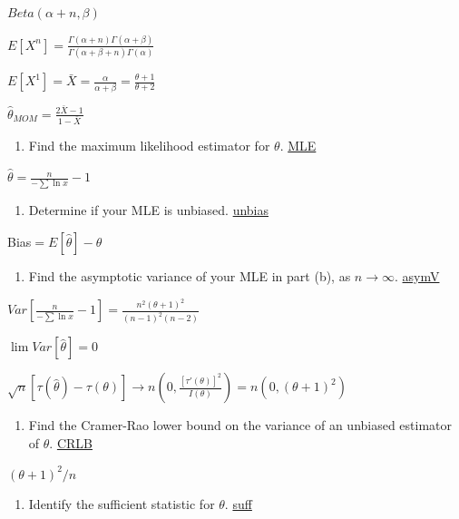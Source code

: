 \documentclass[10pt,twocolumn,portrait]{article}
\providecommand{\tightlist}{%
  \setlength{\itemsep}{0pt}\setlength{\parskip}{0pt}}
\begin{document}
\(Beta(\alpha+n,\beta)\)

\(E[X^n]=\frac{\Gamma(\alpha+n)\Gamma(\alpha+\beta)}{\Gamma(\alpha+\beta+n)\Gamma(\alpha)}\)

\(E[X^1]=\bar X=\frac{\alpha}{\alpha+\beta}=\frac{\theta+1}{\theta+2}\)

\(\hat\theta_{MOM}=\frac{2\bar X-1}{1-\bar X}\)

\begin{enumerate}
\def\labelenumi{(\alph{enumi})}
\setcounter{enumi}{1}
\tightlist
\item
  Find the maximum likelihood estimator for \(\theta\).
  \protect\hyperlink{MLE}{MLE}
\end{enumerate}

\(\hat\theta=\frac{n}{-\sum\ln x}-1\)

\begin{enumerate}
\def\labelenumi{(\alph{enumi})}
\setcounter{enumi}{2}
\tightlist
\item
  Determine if your MLE is unbiased.
  \protect\hyperlink{section-4}{unbias}
\end{enumerate}

Bias\(=E[\hat\theta]-\theta\)

\begin{enumerate}
\def\labelenumi{(\alph{enumi})}
\setcounter{enumi}{3}
\tightlist
\item
  Find the asymptotic variance of your MLE in part (b), as
  \(n\to\infty\). \protect\hyperlink{asymV}{asymV}
\end{enumerate}

\(Var[\frac{n}{-\sum\ln x}-1]=\frac{n^2(\theta+1)^2}{(n-1)^2(n-2)}\)

\(\lim Var[\hat\theta]=0\)

\(\sqrt{n}[\tau(\hat\theta)-\tau(\theta)]\to n(0,\frac{[\tau'(\theta)]^2}{I(\theta)})=n(0,(\theta+1)^2)\)

\begin{enumerate}
\def\labelenumi{(\alph{enumi})}
\setcounter{enumi}{4}
\tightlist
\item
  Find the Cramer-Rao lower bound on the variance of an unbiased
  estimator of \(\theta\). \protect\hyperlink{section-5}{CRLB}
\end{enumerate}

\((\theta+1)^2/n\)

\begin{enumerate}
\def\labelenumi{(\alph{enumi})}
\setcounter{enumi}{5}
\tightlist
\item
  Identify the sufficient statistic for \(\theta\).
  \protect\hyperlink{section-6}{suff}
\end{enumerate}
\end{document}
